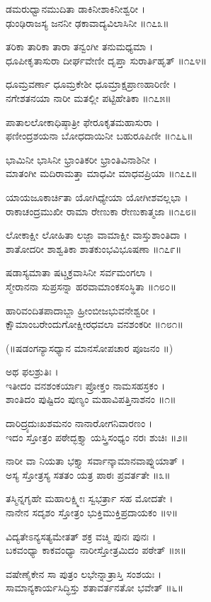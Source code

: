 ಡಮರುಧ್ವಾನಮುದಿತಾ ಡಾಕಿನೀಶಾಕಿನೀಶ್ವರೀ ।\\
ಢುಂಢಿರಾಜಸ್ಯ ಜನನೀ ಢಕಾವಾದ್ಯವಿಲಾಸಿನೀ ॥೧೭೩॥

ತರಿಕಾ ತಾರಿಕಾ ತಾರಾ ತನ್ವಂಗೀ ತನುಮಧ್ಯಮಾ ।\\
ಧೂಪೀಕೃತಾಸುರಾ ದೀರ್ಘವೇಣೀ ದೃಪ್ತಾ ಸುರಾರ್ತಿಹೃತ್ ॥೧೭೪॥

ಧೂಮ್ರವರ್ಣಾ ಧೂಮ್ರಕೇಶೀ ಧೂಮ್ರಾಕ್ಷಪ್ರಾಣಹಾರಿಣೀ ।\\
ನಗೇಶತನಯಾ ನಾರೀ ಮತಲ್ಲೀ ಪಟ್ಟಿಹೇತಿಕಾ ॥೧೭೫॥

ಪಾತಾಲಲೋಕಾಧಿಷ್ಠಾತ್ರೀ ಫೇರೂಕೃತಮಹಾಸುರಾ ।\\
ಫಣೀಂದ್ರಶಯನಾ ಬೋಧದಾಯಿನೀ ಬಹುರೂಪಿಣೀ ॥೧೭೬॥

ಭಾಮಿನೀ ಭಾಸಿನೀ ಭ್ರಾಂತಿಕರೀ ಭ್ರಾಂತಿವಿನಾಶಿನೀ ।\\
ಮಾತಂಗೀ ಮದಿರಾಮತ್ತಾ ಮಾಧವೀ ಮಾಧವಪ್ರಿಯಾ ॥೧೭೭॥

ಯಾಯಜೂಕಾರ್ಚಿತಾ ಯೋಗಿಧ್ಯೇಯಾ ಯೋಗೀಶವಲ್ಲಭಾ ।\\
ರಾಕಾಚಂದ್ರಮುಖೀ ರಾಮಾ ರೇಣುಕಾ ರೇಣುಕಾತ್ಮಜಾ ॥೧೭೮॥

ಲೋಕಾಕ್ಷೀ ಲೋಹಿತಾ ಲಜ್ಜಾ ವಾಮಾಕ್ಷೀ ವಾಸ್ತುಶಾಂತಿದಾ ।\\
ಶಾತೋದರೀ ಶಾಶ್ವತಿಕಾ ಶಾತಕುಂಭವಿಭೂಷಣಾ ॥೧೭೯॥

ಷಡಾಸ್ಯಮಾತಾ ಷಟ್ಚಕ್ರವಾಸಿನೀ ಸರ್ವಮಂಗಲಾ ।\\
ಸ್ಮೇರಾನನಾ ಸುಪ್ರಸನ್ನಾ ಹರವಾಮಾಂಕಸಂಸ್ಥಿತಾ ॥೧೮೦॥

ಹಾರಿವಂದಿತಪಾದಾಬ್ಜಾ ಹ್ರೀಂಬೀಜಭುವನೇಶ್ವರೀ ।\\
ಕ್ಷೌಮಾಂಬರೇಂದುಗೋಕ್ಷೀರಧವಲಾ ವನಶಂಕರೀ ॥೧೮೧॥

(॥ಷಡಂಗನ್ಯಾಸಧ್ಯಾನ ಮಾನಸೋಪಚಾರ ಪೂಜನಂ ॥)

ಅಥ ಫಲಶ್ರುತಿಃ ।\\
ಇತೀದಂ ವನಶಂಕರ್ಯಾಃ ಪ್ರೋಕ್ತಂ ನಾಮಸಹಸ್ರಕಂ ।\\
ಶಾಂತಿದಂ ಪುಷ್ಟಿದಂ ಪುಣ್ಯಂ ಮಹಾವಿಪತ್ತಿನಾಶನಂ ॥೧॥

ದಾರಿದ್ರ್ಯದುಃಖಶಮನಂ ನಾನಾರೋಗನಿವಾರಣಂ ।\\
ಇದಂ ಸ್ತೋತ್ರಂ ಪಠೇದ್ಭಕ್ತ್ಯಾ ಯಸ್ತ್ರಿಸಂಧ್ಯಂ ನರಃ ಶುಚಿಃ ॥೨॥

ನಾರೀ ವಾ ನಿಯತಾ ಭಕ್ತ್ಯಾ ಸರ್ವಾನ್ಕಾಮಾನವಾಪ್ನುಯಾತ್ ।\\
ಅಸ್ಯ ಸ್ತೋತ್ರಸ್ಯ ಸತತಂ ಯತ್ರ ಪಾಠಃ ಪ್ರವರ್ತತೇ ॥೩॥

ತಸ್ಮಿನ್ನಗೃಹೇ ಮಹಾಲಕ್ಷ್ಮೀಃ ಸ್ವಭರ್ತ್ರಾ ಸಹ ಮೋದತೇ ।\\
ನಾನೇನ ಸದೃಶಂ ಸ್ತೋತ್ರಂ ಭುಕ್ತಿಮುಕ್ತಿಪ್ರದಾಯಕಂ ॥೪॥

ವಿದ್ಯತೇಽನ್ಯಸತ್ಯಮೇತತ್ ಶಕ್ರ ವಚ್ಮಿ ಪುನಃ ಪುನಃ ।\\
ಬಕವಂಧ್ಯಾ ಕಾಕವಂಧ್ಯಾ ನಾರೀಸ್ತೋತ್ರಮಿದಂ ಪಠೇತ್ ॥೫॥

ವಷೇಣೈಕೇನ ಸಾ ಪುತ್ರಂ ಲಭೇನ್ನಾತ್ರಾಸ್ತಿ ಸಂಶಯಃ ।\\
ಸಾಮಾನ್ಯಕಾರ್ಯಸಿದ್ಧಿಸ್ತು ಶತಾವರ್ತನತೋ ಭವೇತ್ ॥೬॥


